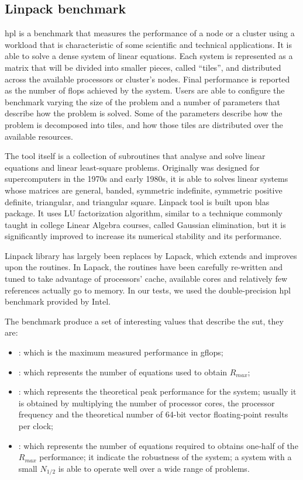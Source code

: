 \subsection{Linpack benchmark}
\label{sec:measurements-cpu-linpack}
\ac{hpl} \cite{linpackBenchmark} is a benchmark that measures the performance of a node or a cluster
using a workload that is characteristic of some scientific and technical applications. It is able to
solve a dense system of linear equations. Each system is represented as a matrix that will be divided
into smaller pieces, called ``tiles'', and distributed across the available processors or cluster's
nodes. Final performance is reported as the number of \ac{flops} achieved by the system. Users are able
to configure the benchmark varying the size of the problem and a number of parameters that describe
how the problem is solved. Some of the parameters describe how the problem is decomposed into tiles,
and how those tiles are distributed over the available resources.

The tool itself is a collection of subroutines that analyse and solve linear equations and linear
least-square problems. Originally was designed for supercomputers in the 1970s and early 1980s, it is able
to solves linear systems whose matrices are general, banded, symmetric indefinite, symmetric positive
definite, triangular, and triangular square. Linpack tool is built upon \ac{blas} package. It
uses LU factorization algorithm, similar to a technique commonly taught in college Linear Algebra courses,
called Gaussian elimination, but it is significantly improved to increase its numerical stability and
its performance.

Linpack library has largely been replaces by Lapack, which extends and improves upon the routines. In
Lapack, the routines have been carefully re-written and tuned to take advantage of processors' cache,
available cores and relatively few references actually go to memory. In our tests, we used the
double-precision \ac{hpl} benchmark provided by Intel.

The benchmark produce a set of interesting values that describe the \ac{sut}, they are:

\begin{itemize}
	\item{: which is the maximum measured performance in \ac{gflops};}
	\item{: which represents the number of equations used to obtain $R_{max}$;}
	\item{: which represents the theoretical peak performance for the system; usually
		it is obtained by multiplying the number of processor cores, the processor frequency and the
		theoretical number of 64-bit vector floating-point results per clock;}
	\item{: which represents the number of equations required to obtains one-half
		of the $R_{max}$ performance; it indicate the robustness of the system; a system with
		a small $N_{1/2}$ is able to operate well over a wide range of problems.}
\end{itemize}

